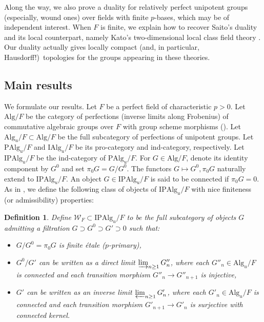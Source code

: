 \documentclass{amsart}
\newtheorem{Def}[Thm]{Definition}
\theoremstyle{remark}
\numberwithin{equation}{section}
\newcommand{\dirlim}{\varinjlim}
\newcommand{\invlim}{\varprojlim}
\newcommand{\Alg}{\mathrm{Alg}}
\newcommand{\Ind}{\mathrm{I}}
\newcommand{\Pro}{\mathrm{P}}
\begin{document}
Along the way, we also prove a duality for relatively perfect unipotent groups (especially, wound ones)
over fields with finite $p$-bases,
which may be of independent interest.
When $F$ is finite, we explain how to recover Saito's duality
and its local counterpart, namely Kato's two-dimensional local class field theory \cite{Kat79}.
Our duality actually gives locally compact (and, in particular, Hausdorff!)\ topologies for
the groups appearing in these theories.


\subsection{Main results}

We formulate our results.
Let $F$ be a perfect field of characteristic $p > 0$.
Let $\Alg / F$ be the category of perfections (inverse limits along Frobenius)
of commutative algebraic groups over $F$
with group scheme morphisms (\cite{Ser60}).
Let $\Alg_{u} / F \subset \Alg / F$ be the full subcategory
of perfections of unipotent groups.
Let $\Pro \Alg_{u} / F$ and $\Ind \Alg_{u} / F$ be its pro-category and ind-category, respectively.
Let $\Ind \Pro \Alg_{u} / F$ be the ind-category of $\Pro \Alg_{u} / F$.
For $G \in \Alg / F$, denote its identity component by $G^{0}$
and set $\pi_{0} G = G / G^{0}$.
The functors $G \mapsto G^{0}, \pi_{0} G$ naturally extend to $\Ind \Pro \Alg_{u} / F$.
An object $G \in \Ind \Pro \Alg_{u} / F$ is said to be connected
if $\pi_{0} G = 0$.
As in \cite[Definition 3.1.1]{Suz24},
we define the following class of objects of $\Ind \Pro \Alg_{u} / F$
with nice finiteness (or admissibility) properties:

\begin{Def}
	Define $\mathcal{W}_{F} \subset \Ind \Pro \Alg_{u} / F$ to be
	the full subcategory of objects $G$
	admitting a filtration $G \supset G^{0} \supset G' \supset 0$ such that:
	\begin{itemize}
		\item
			$G / G^{0} = \pi_{0} G$ is finite \'etale ($p$-primary),
		\item
			$G^{0} / G'$ can be written as a direct limit $\dirlim_{n \ge 1} G''_{n}$,
			where each $G''_{n} \in \Alg_{u} / F$ is connected
			and each transition morphism $G''_{n} \to G''_{n + 1}$ is injective,
		\item
			$G'$ can be written as an inverse limit $\invlim_{n \ge 1} G'_{n}$,
			where each $G'_{n} \in \Alg_{u} / F$ is connected
			and each transition morphism $G'_{n + 1} \to G'_{n}$ is surjective
			with connected kernel.
	\end{itemize}
\end{Def}
\end{document}
